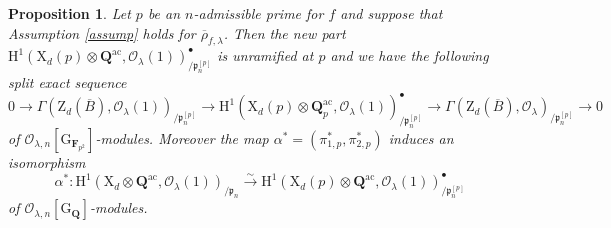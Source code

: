\documentclass[10pt]{amsart}
\numberwithin{equation}{section}
\theoremstyle{plain}
\newtheorem{proposition}[theorem]{Proposition}
\numberwithin{equation}{section}
\theoremstyle{definition}
\theoremstyle{remark}
\def\ac{\mathrm{ac}}
\def\Qbar{\QQ^{\ac}}
\def\ac{\mathrm{ac}}
\def\calO{\mathcal{O}}
\def\frakp{\mathfrak{p}}
\def\FF{\mathbf{F}}
\def\QQ{\mathbf{Q}}
\def\rmG{\mathrm{G}}
\def\rmH{\mathrm{H}}
\def\rmX{\mathrm{X}}
\def\rmZ{\mathrm{Z}}
\begin{document}
\begin{proposition}\label{new-old-part}
Let $p$ be an $n$-admissible prime for $f$ and suppose that Assumption \ref{assump} holds for $\overline{\rho}_{f,\lambda}$. Then the new part $\rmH^{1}({\rmX}_{d}(p)\otimes{\QQ^{\ac}}, \calO_{\lambda}(1))^{\bullet}_{/\frakp^{[p]}_{n}}$ is unramified at $p$ and we have the following split exact sequence
\begin{equation*}
0\rightarrow\Gamma(\rmZ_{d}(\overline{B}), \calO_{\lambda}(1))_{/\frakp^{[p]}_{n}}\rightarrow \rmH^{1}({\rmX}_{d}(p)\otimes{\QQ^{\ac}_{p}}, \calO_{\lambda}(1))^{\bullet}_{/\frakp^{[p]}_{n}}\rightarrow \Gamma(\rmZ_{d}(\overline{B}), \calO_{\lambda})_{/\frakp^{[p]}_{n}}\rightarrow0
\end{equation*}
of $\calO_{\lambda, n}[\rmG_{\FF_{p^{2}}}]$-modules.
Moreover the map $\alpha^{\ast}=(\pi^{\ast}_{1,p}, \pi^{\ast}_{2,p})$ induces an isomorphism 
\begin{equation*}
\alpha^{\ast}: \rmH^{1}({\rmX}_{d}\otimes{\Qbar}, \calO_{\lambda}(1))_{/\frakp_{n}}\xrightarrow{\sim} \rmH^{1}(\rmX_{d}(p)\otimes{\Qbar}, \calO_{\lambda}(1))^{\bullet}_{/\frakp^{[p]}_{n}}
\end{equation*}
of $\calO_{\lambda, n}[\rmG_{\QQ}]$-modules.
\end{proposition}
\end{document}
